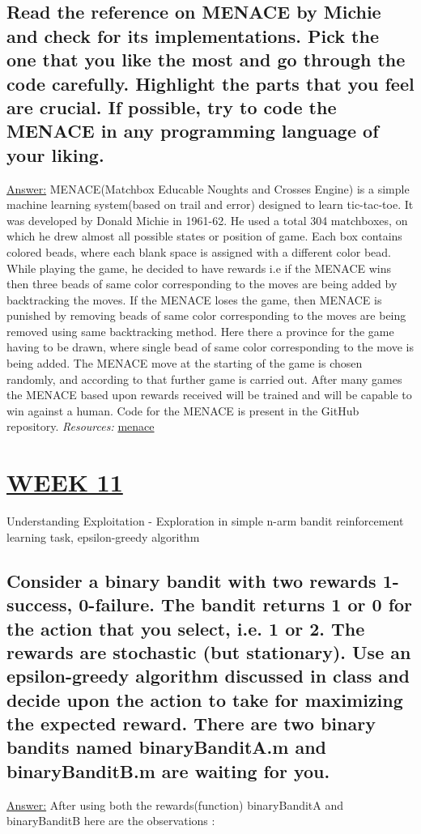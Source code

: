 \documentclass[15pt,journal]{IEEEtran}
\begin{document}
\subsection{Read the reference on MENACE by Michie and check for its implementations.  Pick the one that you like the most and go through the code carefully.  Highlight the parts that you feel are crucial.  If possible, try to code the MENACE in any programming language of your liking.}
\underline{Answer:} 
MENACE(Matchbox Educable Noughts and Crosses Engine) is a simple machine learning system(based on trail and error) designed to learn tic-tac-toe. It was developed by Donald Michie in 1961-62. He used a total 304 matchboxes, on which he drew almost all possible states or position of game. Each box contains colored beads, where each blank space is assigned with a different color bead. While playing the game, he decided to have rewards i.e if the MENACE wins then three beads of same color corresponding to the moves are being added by backtracking the moves. If the MENACE loses the game, then MENACE is punished by removing beads of same color corresponding to the moves are being removed using same backtracking method. Here there a province for the game having to be drawn, where single bead of same color corresponding to the move is being added. The MENACE move at the starting of the game is chosen randomly, and according to that further game is carried out. After many games the MENACE based upon rewards received will be trained and will be capable to win against a human. Code for the MENACE is present in the GitHub repository.
\emph{Resources:} \href{https://people.csail.mit.edu/brooks/idocs/matchbox.pdf}{menace}



\section{\large{\underline{WEEK 11}}}
Understanding Exploitation - Exploration in simple n-arm bandit reinforcement learning task, epsilon-greedy algorithm

\subsection{Consider a binary bandit with two rewards {1-success, 0-failure}.  The bandit returns 1 or 0 for the action that you select, i.e. 1 or 2.  The rewards are stochastic (but stationary).  Use an epsilon-greedy algorithm discussed in class and decide upon the action to take for maximizing the expected reward.  There are two binary bandits named binaryBanditA.m and binaryBanditB.m are waiting for you.}
\underline{Answer:}
After using both the rewards(function) binaryBanditA and
binaryBanditB here are the observations :
\end{document}
